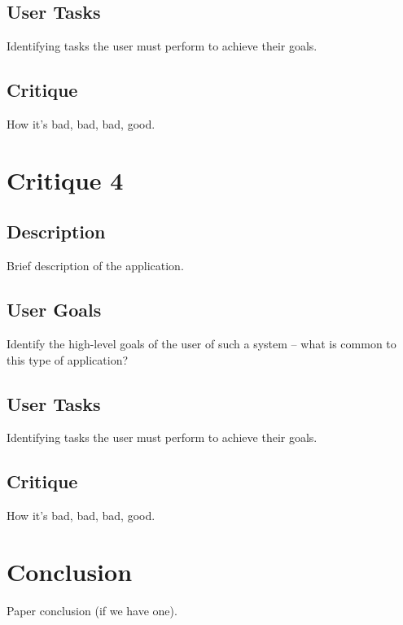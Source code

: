 \documentclass{sigchi}
\begin{document}
\subsection{User Tasks}
Identifying tasks the user must perform to achieve their goals.

\subsection{Critique}
How it's bad, bad, bad, good.



\section{Critique 4}
\subsection{Description}
Brief description of the application.

\subsection{User Goals}
Identify the high-level goals of the user of such a system – what is common to this type of
application?

\subsection{User Tasks}
Identifying tasks the user must perform to achieve their goals.

\subsection{Critique}
How it's bad, bad, bad, good.









\section{Conclusion}
Paper conclusion (if we have one).




%
%
%
%
%
\balance



\end{document}
